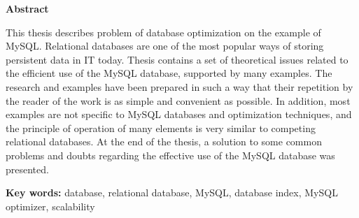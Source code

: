 \documentclass[11pt,a4paper,leqno]{article}
\newcommand{\totalemptypage}{\newpage\thispagestyle{empty}\null\newpage}
\begin{document}
\thispagestyle{empty}

{\Large \textbf{Abstract}}

\vspace{0.5 cm}

This thesis describes problem of database optimization on the example of MySQL. Relational databases are one of the most popular ways of storing persistent data in IT today. Thesis contains a set of theoretical issues related to the efficient use of the MySQL database, supported by many examples. The research and examples have been prepared in such a way that their repetition by the reader of the work is as simple and convenient as possible. In addition, most examples are not specific to MySQL databases and optimization techniques, and the principle of operation of many elements is very similar to competing relational databases. At the end of the thesis, a solution to some common problems and doubts regarding the effective use of the MySQL database was presented.

\vspace{0.5 cm}

{ \textbf{Key words: }} 
database, relational database, MySQL, database index, MySQL optimizer, scalability


\totalemptypage

\tableofcontents
\newpage



\newpage

\newpage

\newpage

\newpage

\newpage

\newpage

\newpage

\newpage

\newpage

\newpage

\end{document}
